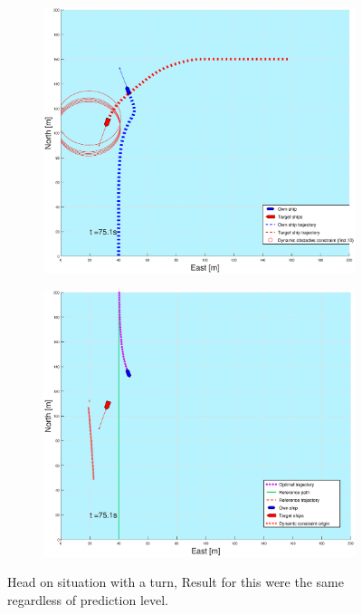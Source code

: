 \begin{figure}[ht!]
\begin{subfigure}[b]{0.499\textwidth}
    \end{subfigure}
    \hfill
    \\
    \begin{subfigure}[b]{0.49\textwidth}
        \centering
        \includegraphics[width=\textwidth]{Images/Figures/sving_HO/_Simple_0fig1_time=75}
    \end{subfigure}
    \hfill
    \begin{subfigure}[b]{0.499\textwidth}
        \centering
        \includegraphics[width=\textwidth]{Images/Figures/sving_HO/_Simple_0fig999_time=75}
    \end{subfigure}
    \hfill
    \caption{Head on situation with a turn, Result for this were the same regardless of prediction level.}
\end{figure}%
